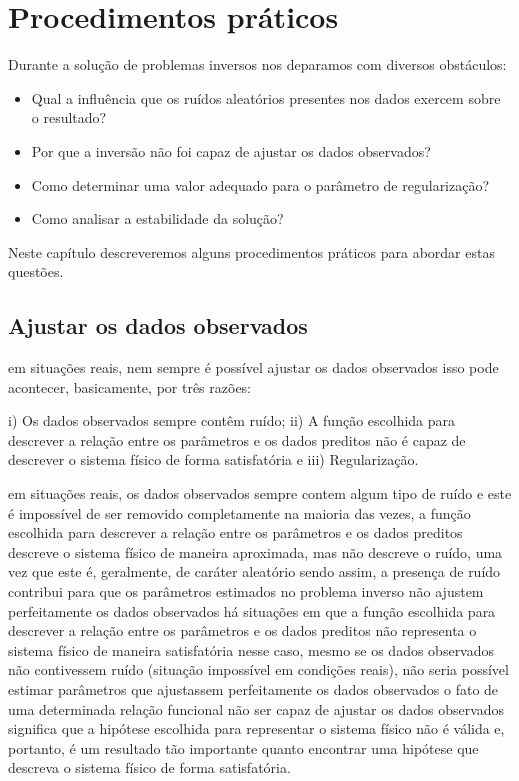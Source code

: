 \chapter{Procedimentos práticos}
\label{chap:proc_praticos}

Durante a solução de problemas inversos nos deparamos com diversos obstáculos:

\begin{itemize}
\item Qual a influência que os ruídos aleatórios presentes nos dados exercem sobre o resultado?
\item Por que a inversão não foi capaz de ajustar os dados observados?
\item Como determinar uma valor adequado para o parâmetro de regularização?
\item Como analisar a estabilidade da solução?
\end{itemize}

\noindent Neste capítulo descreveremos alguns procedimentos práticos para abordar
estas questões.

\section{Ajustar os dados observados}

em situações reais, nem sempre é possível ajustar os dados observados
isso pode acontecer, basicamente, por três razões:

i) Os dados observados sempre contêm ruído;
ii) A função escolhida para descrever a relação entre os parâmetros e os dados preditos não é
capaz de descrever o sistema físico de forma satisfatória e
iii) Regularização.

em situações reais, os dados observados sempre contem algum tipo de ruído e este é
impossível de ser removido completamente
na maioria das vezes, a função escolhida para descrever a relação entre os parâmetros e os
dados preditos descreve o sistema físico de maneira aproximada, mas não descreve o ruído,
uma vez que este é, geralmente, de caráter aleatório
sendo assim, a presença de ruído contribui para que os parâmetros estimados no problema
inverso não ajustem perfeitamente os dados observados
há situações em que a função escolhida para descrever a relação entre os parâmetros e os
dados preditos não representa o sistema físico de maneira satisfatória
nesse caso, mesmo se os dados observados não contivessem ruído (situação impossível em
condições reais), não seria possível estimar parâmetros que ajustassem perfeitamente os
dados observados
o fato de uma determinada relação funcional não ser capaz de ajustar os dados observados
significa que a hipótese escolhida para representar o sistema físico não é válida e, portanto, é
um resultado tão importante quanto encontrar uma hipótese que descreva o sistema físico de
forma satisfatória.


